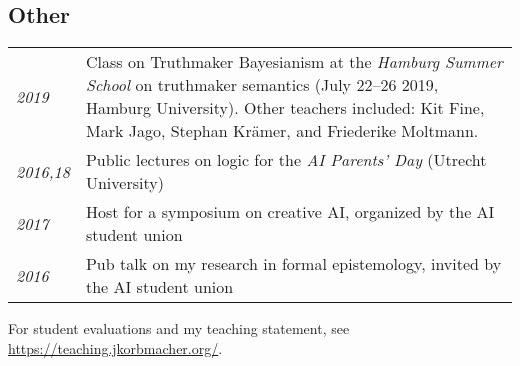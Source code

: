 \subsection*{Other}
\begin{tabular}{l p{.8\linewidth}}
  \emph{2019}    & Class on Truthmaker Bayesianism at the \emph{Hamburg Summer
                   School} on truthmaker semantics (July 22--26 2019, Hamburg University). Other
                   teachers included: Kit Fine, Mark Jago, Stephan Kr\"amer, and Friederike
                   Moltmann. \\
  \emph{2016,18} & Public lectures on logic for the \emph{AI Parents' Day} (Utrecht University)\\[1ex]
  \emph{2017}    & Host for a symposium on creative AI, organized by the AI student union\\[1ex]
  \emph{2016}    & Pub talk on my research in formal epistemology, invited by the AI student union\\
\end{tabular}

For student evaluations and my teaching statement, see \url{https://teaching.jkorbmacher.org/}.


